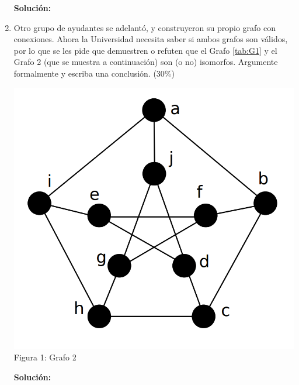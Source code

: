 \documentclass[letterpaper,10pt]{article}
\begin{document}
\begin{enumerate}
\textbf{Solución:}

    
    \item Otro grupo de ayudantes se adelantó, y construyeron su propio grafo con conexiones. Ahora la Universidad necesita saber si ambos grafos son válidos, por lo que se les pide que demuestren o refuten que el Grafo \ref{tab:G1} y el Grafo 2 (que se muestra a continuación) son (o no) isomorfos. Argumente formalmente y escriba una conclusión. (30\%)
    \begin{center}
    \includegraphics[scale=0.25]{Screenshot_3.png}\\
    Figura 1: Grafo 2
    \end{center} 
    
    
\textbf{Solución:}
\end{enumerate}
\newpage
\end{document}
